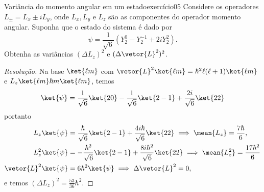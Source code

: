 \begin{exercício}{Variância do momento angular em um estado}{exercício05}
    Considere os operadores \(L_\pm = L_x \pm i L_y\), onde \(L_x, L_y\) e \(L_z\) são as componentes do operador momento angular. Suponha que o estado do sistema é dado por
    \begin{equation*}
        \psi = \frac1{\sqrt{6}}\left(Y_2^0 - Y_2^{-1} + 2i Y_2^2\right).
    \end{equation*}
    Obtenha as variâncias \((\Delta L_z)^2\) e \((\Delta \vetor{L}^2)^2\).
\end{exercício}
\begin{proof}[Resolução]
    Na base \(\ket{\ell m}\) com \(\vetor{L}^2 \ket{\ell m} = \hbar^2 \ell (\ell + 1) \ket{\ell m}\) e \(L_z \ket{\ell m} \hbar m \ket{\ell m}\), temos
    \begin{equation*}
        \ket{\psi} = \frac1{\sqrt6} \ket{20} - \frac{1}{\sqrt6}\ket{2-1} + \frac{2i}{\sqrt{6}}\ket{22}
    \end{equation*}
    portanto
    \begin{align*}
        L_z \ket{\psi} &= \frac{\hbar}{\sqrt{6}}\ket{2-1} + \frac{4i\hbar}{\sqrt{6}} \ket{22} \implies \mean{L_z} = \frac{7\hbar}{6},\\
        L_z^2\ket{\psi} &= -\frac{\hbar^2}{\sqrt{6}} \ket{2-1} + \frac{8i\hbar^2}{\sqrt{6}}\ket{22} \implies \mean{L_z^2} = \frac{17\hbar^2}{6}\\
        \vetor{L}^2\ket{\psi} &= 6\hbar^2 \ket{\psi} \implies \Delta \vetor{L}^2 = 0,
    \end{align*}
    e temos \((\Delta L_z)^2 = \frac{53}{36}\hbar^2\).
\end{proof}
